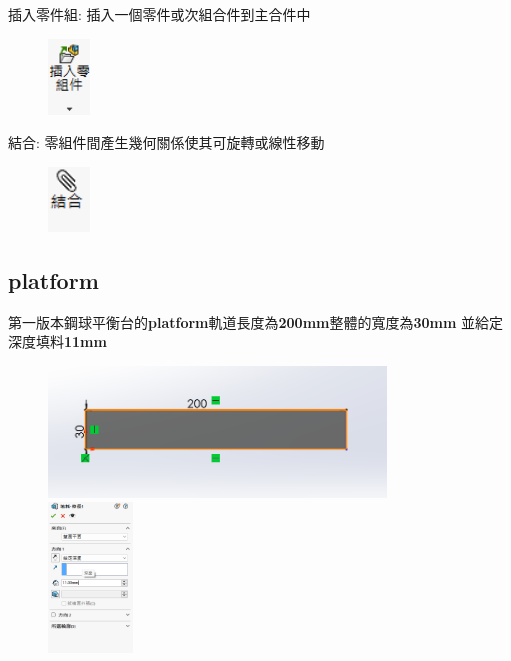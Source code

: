 \noindent 插入零件組: 插入一個零件或次組合件到主合件中

\begin{figure}[h!]
    \centering
    \includegraphics[width=0.1\textwidth]{./../images/6-1-9.png}
\end{figure}

\noindent 結合: 零組件間產生幾何關係使其可旋轉或線性移動

\begin{figure}[h!]
    \centering
    \includegraphics[width=0.1\textwidth]{./../images/6-1-10.png}
\end{figure}

\subsection{platform}
第一版本鋼球平衡台的\textbf{platform}軌道長度為\textbf{200mm}整體的寬度為\textbf{30mm} 並給定深度填料\textbf{11mm}

\begin{figure}[h!]
    \centering
    \includegraphics[width=0.8\textwidth]{./../images/6-1-11.png}
    \includegraphics[width=0.2\textwidth]{./../images/6-1-12.png}
\end{figure}


